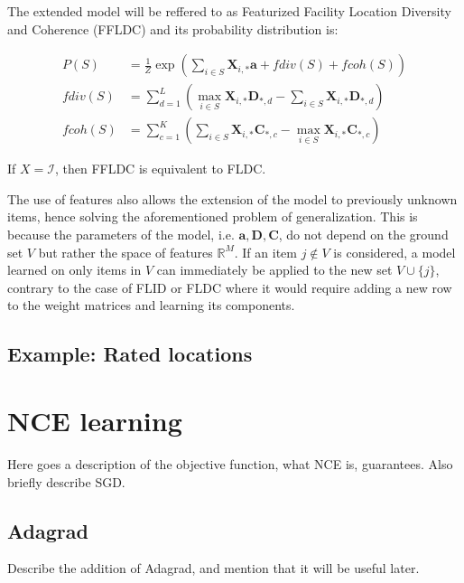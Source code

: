 The extended model will be reffered to as Featurized Facility Location Diversity and Coherence (FFLDC) and its probability distribution is:

\begin{align}
  \tag{FFLDC}
  P(S) &= \frac{1}{Z}\exp{\left(\sum_{i \in S}{\mathbf{X}_{i,*}\mathbf{a}} + fdiv(S) + fcoh(S)\right)} \\
  fdiv(S) &= \sum_{d=1}^{L}{\left(\max_{i \in S}{\mathbf{X}_{i,*}\mathbf{D}_{*,d}} - \sum_{i \in S}{\mathbf{X}_{i,*}\mathbf{D}_{*,d}}\right)} \\
  fcoh(S) &= \sum_{c=1}^{K}{\left(\sum_{i \in S}{\mathbf{X}_{i,*}\mathbf{C}_{*,c}} - \max_{i \in S}{\mathbf{X}_{i,*}\mathbf{C}_{*,c}}\right)}
  \label{eq:ffldc}
\end{align}

\begin{remark}
  If $X = \mathcal{I}$, then FFLDC is equivalent to FLDC.
\end{remark}

The use of features also allows the extension of the model to previously unknown items, hence solving the aforementioned problem of generalization. This is because the parameters of the model, i.e. $\mathbf{a}, \mathbf{D}, \mathbf{C}$, do not depend on the ground set $V$ but rather the space of features $\mathbb{R}^{M}$. If an item $j \notin V$ is considered, a model learned on only items in $V$ can immediately be applied to the new set $V \cup \{j\}$, contrary to the case of FLID or FLDC where it would require adding a new row to the weight matrices and learning its components.

\subsection{Example: Rated locations}

\section{NCE learning}

Here goes a description of the objective function, what NCE is, guarantees. Also briefly describe SGD.

\subsection{Adagrad}

Describe the addition of Adagrad, and mention that it will be useful later.

